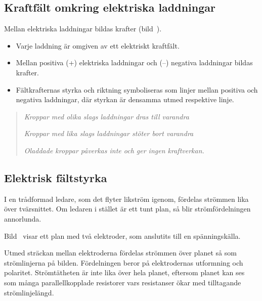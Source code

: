 \newpage
{}

\subsection{Kraftfält omkring elektriska laddningar}


\noindent
Mellan elektriska laddningar bildas krafter (bild~).

\begin{itemize}
  \item Varje laddning är omgiven av ett elektriskt kraftfält.
  \item Mellan positiva (+) elektriska laddningar och (--) negativa laddningar
  bildas krafter.
  \item Fältkrafternas styrka och riktning symboliseras som linjer mellan
  positiva och negativa laddningar, där styrkan är densamma utmed respektive
  linje.
\end{itemize}

\begin{quote}
\emph{Kroppar med olika slags laddningar dras till varandra}

\emph{Kroppar med lika slags laddningar stöter bort varandra}

\emph{Oladdade kroppar påverkas inte och ger ingen kraftverkan.}
\end{quote}

\subsection{Elektrisk fältstyrka}
\label{elektrisk_fälststyrka}


I en trådformad ledare, som det flyter likström igenom, fördelas strömmen lika
över tvärsnittet.
Om ledaren i stället är ett tunt plan, så blir strömfördelningen annorlunda.

Bild~ visar ett plan med två elektroder, som anslutits
till en spänningskälla.

Utmed sträckan mellan elektroderna fördelas strömmen över planet så som
strömlinjerna på bilden.
Fördelningen beror på elektrodernas utformning och polaritet.
Strömtätheten är inte lika över hela planet, eftersom planet kan ses som många
parallellkopplade resistorer vars resistanser ökar med tilltagande
strömlinjelängd.

